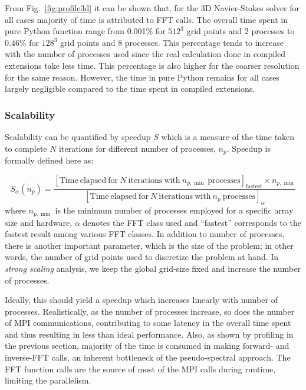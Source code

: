 \documentclass{../jors}
\begin{document}
From Fig.~\ref{fig:profile3d} it can be shown that, for the 3D Navier-Stokes
solver for all cases majority of time is attributed to FFT calls. The overall time
spent in pure Python function range from 0.001\% for $512^3$ grid points and 2
processes to 0.46\% for $128^3$ grid points and 8 processes.
%
This percentage tends to increase with the number of processes used since the real
calculation done in compiled extensions take less time.
%
This percentage is also higher for the coarser resolution for the same reason.
%
However, the time in pure Python remains for all cases largely negligible compared
to the time spent in compiled extensions.


\subsubsection*{Scalability}

Scalability can be quantified by speedup $S$ which is a measure of the time taken
to complete $N$ iterations for different number of processes, $n_p$.
Speedup is formally defined here as:

\begin{equation}
S_\alpha(n_p) = \frac
{[\mathrm{Time\ elapsed\ for\ } N \mathrm{\ iterations\ with\ }n_{p,\min}\mathrm{\ processes}]_{\mathrm{fastest}}
\times n_{p,\min}}
{[\mathrm{Time\ elapsed\ for\ } N \mathrm{\ iterations\ with\ } n_p \mathrm{\
processes}]_\alpha}
\label{eq:speedup}
\end{equation}
where $n_{p,\min}$ is the minimum number of processes employed for a specific
array size and hardware, $\alpha$ denotes the FFT class used and ``fastest''
corresponds to the fastest result among various FFT classes.
%
In addition to number of processes, there is another important parameter, which
is the size of the problem; in other words, the number of grid points used to
discretize the problem at hand.
%
In \emph{strong scaling} analysis, we keep the global grid-size fixed and
increase the number of processes.

Ideally, this should yield a speedup which increases linearly with number of
processes.  Realistically, as the number of processes increase, so does the
number of MPI communications, contributing to some latency in the overall time
spent and thus resulting in less than ideal performance.
%
Also, as shown by profiling in the previous section, majority of the time is
consumed in making forward- and inverse-FFT calls, an inherent bottleneck of
the pseudo-spectral approach. The FFT function calls are the source of most of
the MPI calls during runtime, limiting the parallelism.
\end{document}
